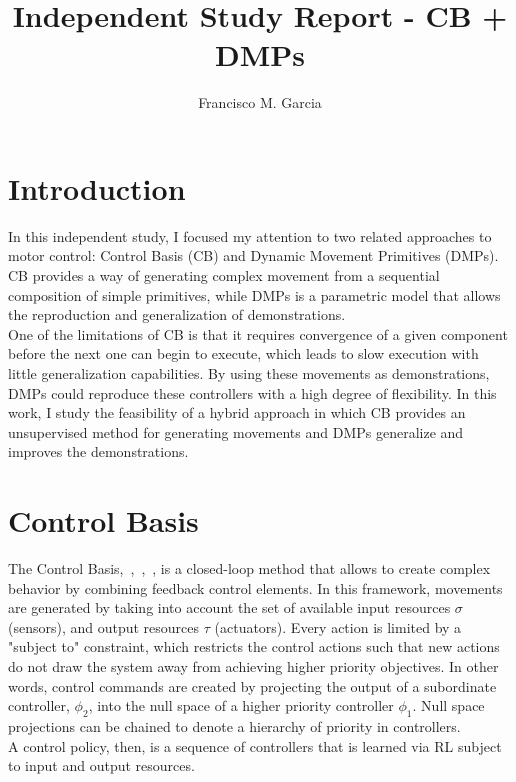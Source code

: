 \documentclass[a4paper]{article}
\begin{document}
\title{Independent Study Report - CB + DMPs}
\author{Francisco M. Garcia}

\maketitle


\section{Introduction}

\indent \indent In this independent study, I focused my attention to two related approaches to motor control: Control Basis (CB) and Dynamic Movement Primitives (DMPs). CB provides a way of generating complex movement from a sequential composition of simple primitives, while DMPs is a parametric model that allows the reproduction and generalization of demonstrations. \\
\indent One of the limitations of CB is that it requires convergence of a given component before the next one can begin to execute, which leads to slow execution with little generalization capabilities. By using these movements as demonstrations, DMPs could reproduce these controllers with a high degree of flexibility. In this work, I study the feasibility of a hybrid approach in which CB provides an unsupervised method for generating movements and DMPs generalize and improves the demonstrations.

\section{Control Basis}

\indent \indent The Control Basis,~\cite{4399481},~\cite{1044003},~\cite{Huber00ahybrid}, is a closed-loop method that allows to create complex behavior by combining feedback control elements. In this framework, movements are generated by taking into account the set of available input resources $\sigma$ (sensors), and output resources $\tau$ (actuators). Every action is limited by a "subject to" constraint, which restricts the control actions such that new actions do not draw the system away from achieving higher priority objectives. In other words, control commands are created by projecting the output  of a subordinate controller, $\phi_2$, into the null space of a higher priority controller $\phi_1$. Null space projections can be chained to denote a hierarchy of priority in controllers. \\
\indent A control policy, then, is a sequence of controllers that is learned via RL subject to input and output resources.     
\end{document}
